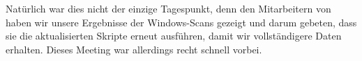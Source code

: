 Natürlich war dies nicht der einzige Tagespunkt, denn den Mitarbeitern von {\aeclientZEZESE} haben wir unsere Ergebnisse der Windows-Scans gezeigt und darum gebeten, dass sie die aktualisierten Skripte erneut ausführen, damit wir vollständigere Daten erhalten.
Dieses Meeting war allerdings recht schnell vorbei.
